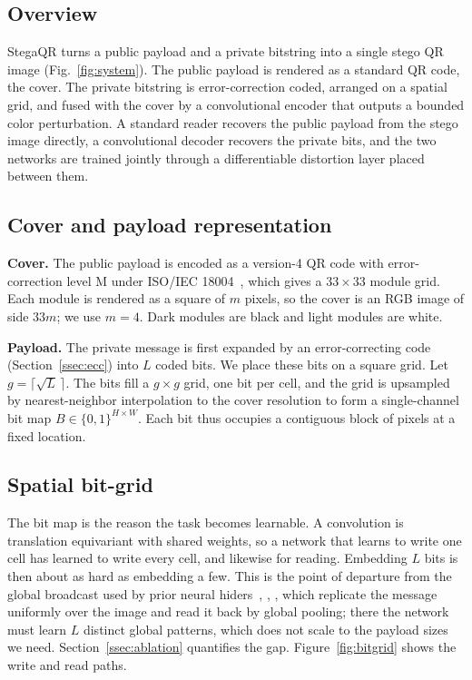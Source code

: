 \documentclass[conference]{IEEEtran}
\begin{document}
\subsection{Overview}
StegaQR turns a public payload and a private bitstring into a single stego QR image
(Fig.~\ref{fig:system}). The public payload is rendered as a standard QR code, the cover.
The private bitstring is error-correction coded, arranged on a spatial grid, and fused
with the cover by a convolutional encoder that outputs a bounded color perturbation. A
standard reader recovers the public payload from the stego image directly, a convolutional
decoder recovers the private bits, and the two networks are trained jointly through a
differentiable distortion layer placed between them.

\subsection{Cover and payload representation}
\textbf{Cover.} The public payload is encoded as a version-4 QR code with error-correction
level M under ISO/IEC 18004~\cite{iso18004}, which gives a $33\times33$ module grid. Each
module is rendered as a square of $m$ pixels, so the cover is an RGB image of side $33m$;
we use $m=4$. Dark modules are black and light modules are white.

\textbf{Payload.} The private message is first expanded by an error-correcting code
(Section~\ref{ssec:ecc}) into $L$ coded bits. We place these bits on a square grid. Let
$g=\lceil\sqrt{L}\,\rceil$. The bits fill a $g\times g$ grid, one bit per cell, and the
grid is upsampled by nearest-neighbor interpolation to the cover resolution to form a
single-channel bit map $B\in\{0,1\}^{H\times W}$. Each bit thus occupies a contiguous
block of pixels at a fixed location.

\subsection{Spatial bit-grid}
\label{ssec:bitgrid}
The bit map is the reason the task becomes learnable. A convolution is translation equivariant
with shared weights, so a network that learns to write one cell has learned to write every
cell, and likewise for reading. Embedding $L$ bits is then about as hard as embedding a
few. This is the point of departure from the global broadcast used by prior neural
hiders~\cite{zhu2018hidden}, \cite{tancik2020stegastamp},
\cite{bui2023rosteals}, which replicate the
message uniformly over the image and read it back by global pooling; there the network
must learn $L$ distinct global patterns, which does not scale to the payload sizes we need.
Section~\ref{ssec:ablation} quantifies the gap. Figure~\ref{fig:bitgrid} shows the write
and read paths.
\end{document}
